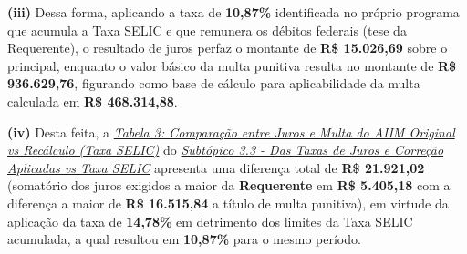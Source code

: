 \textbf{(iii)} Dessa forma, aplicando a taxa de \textbf{10,87\%} identificada no próprio programa que acumula a Taxa SELIC e que remunera os débitos federais (tese da Requerente), o resultado de juros perfaz o montante de \textbf{R\$ 15.026,69} sobre o principal, enquanto o valor básico da multa punitiva resulta no montante de \textbf{R\$ 936.629,76}, figurando como base de cálculo para aplicabilidade da multa calculada em \textbf{R\$ 468.314,88}.

\textbf{(iv)} Desta feita, a \hyperlink{tab3}{\emph{Tabela 3: Comparação entre Juros e Multa do AIIM Original vs Recálculo (Taxa SELIC)}} do \hyperlink{3.3}{\emph{Subtópico 3.3 - Das Taxas de Juros e Correção Aplicadas vs Taxa SELIC}} apresenta uma diferença total de \textbf{R\$ 21.921,02} (somatório dos juros exigidos a maior da \textbf{Requerente} em \textbf{R\$ 5.405,18} com a diferença a maior de \textbf{R\$ 16.515,84} a título de multa punitiva), em virtude da aplicação da taxa de \textbf{14,78\%} em detrimento dos limites da Taxa SELIC acumulada, a qual resultou em \textbf{10,87\%} para o mesmo período.